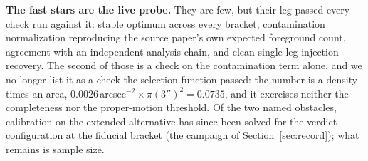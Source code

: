\documentclass[11pt]{article}
\begin{document}
\textbf{The fast stars are the live probe.} They are few, but their leg passed every check run against it: stable optimum across every bracket, contamination normalization reproducing the source paper's own expected foreground count, agreement with an independent analysis chain, and clean single-leg injection recovery. The second of those is a check on the contamination term alone, and we no longer list it as a check the selection function passed: the number is a density times an area, $0.0026$\,arcsec$^{-2} \times \pi(3'')^{2} = 0.0735$, and it exercises neither the completeness nor the proper-motion threshold. Of the two named obstacles, calibration on the extended alternative has since been solved for the verdict configuration at the fiducial bracket (the campaign of Section~\ref{sec:record}); what remains is sample size.
\end{document}

